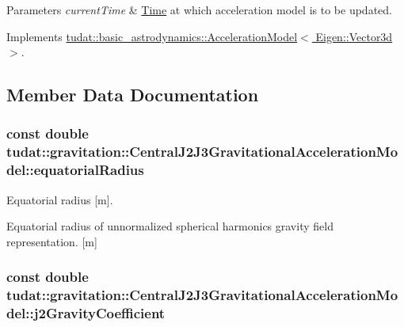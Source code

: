 \begin{DoxyParams}{Parameters}
{\em current\+Time} & \hyperlink{classtudat_1_1Time}{Time} at which acceleration model is to be updated. \\
\hline
\end{DoxyParams}


Implements \hyperlink{classtudat_1_1basic__astrodynamics_1_1AccelerationModel_a966e85b72300b8cbc99ba60e40108d71}{tudat\+::basic\+\_\+astrodynamics\+::\+Acceleration\+Model$<$ Eigen\+::\+Vector3d $>$}.



\subsection{Member Data Documentation}
\subsubsection[{\texorpdfstring{equatorial\+Radius}{equatorialRadius}}]{\setlength{\rightskip}{0pt plus 5cm}const double tudat\+::gravitation\+::\+Central\+J2\+J3\+Gravitational\+Acceleration\+Model\+::equatorial\+Radius\hspace{0.3cm}{\ttfamily [protected]}}\hypertarget{classtudat_1_1gravitation_1_1CentralJ2J3GravitationalAccelerationModel_a49cfbe489574fea31f7b233eef413dc3}{}\label{classtudat_1_1gravitation_1_1CentralJ2J3GravitationalAccelerationModel_a49cfbe489574fea31f7b233eef413dc3}


Equatorial radius \mbox{[}m\mbox{]}. 

Equatorial radius of unnormalized spherical harmonics gravity field representation. \mbox{[}m\mbox{]} 
\subsubsection[{\texorpdfstring{j2\+Gravity\+Coefficient}{j2GravityCoefficient}}]{\setlength{\rightskip}{0pt plus 5cm}const double tudat\+::gravitation\+::\+Central\+J2\+J3\+Gravitational\+Acceleration\+Model\+::j2\+Gravity\+Coefficient\hspace{0.3cm}{\ttfamily [protected]}}\hypertarget{classtudat_1_1gravitation_1_1CentralJ2J3GravitationalAccelerationModel_a7d36540461ca5f8dfead0cee415452b3}{}\label{classtudat_1_1gravitation_1_1CentralJ2J3GravitationalAccelerationModel_a7d36540461ca5f8dfead0cee415452b3}


